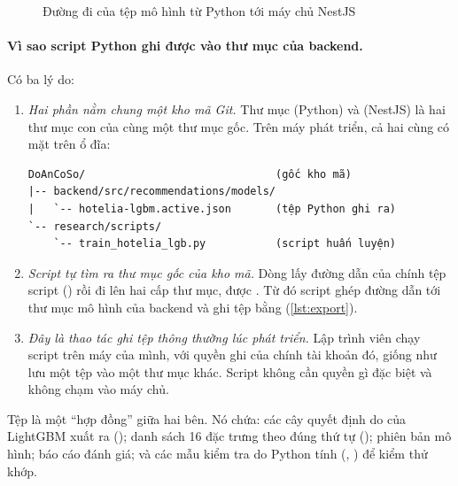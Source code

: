 \begin{figure}[H]
\centering
{}
\caption{Đường đi của tệp mô hình từ Python tới máy chủ NestJS}\label{fig:model-handoff}
\end{figure}

\paragraph{Vì sao script Python ghi được vào thư mục của backend.} Có ba lý do:

\begin{enumerate}
\item \emph{Hai phần nằm chung một kho mã Git.} Thư mục  (Python) và  (NestJS) là hai thư mục con của cùng một thư mục gốc. Trên máy phát triển, cả hai cùng có mặt trên ổ đĩa:
\begin{lstlisting}[numbers=none, language={}]
DoAnCoSo/                              (gốc kho mã)
|-- backend/src/recommendations/models/
|   `-- hotelia-lgbm.active.json       (tệp Python ghi ra)
`-- research/scripts/
    `-- train_hotelia_lgb.py           (script huấn luyện)
\end{lstlisting}
\item \emph{Script tự tìm ra thư mục gốc của kho mã.} Dòng  lấy đường dẫn của chính tệp script () rồi đi lên hai cấp thư mục, được . Từ đó script ghép đường dẫn tới thư mục mô hình của backend và ghi tệp bằng  (\cref{lst:export}).
\item \emph{Đây là thao tác ghi tệp thông thường lúc phát triển.} Lập trình viên chạy script trên máy của mình, với quyền ghi của chính tài khoản đó, giống như lưu một tệp vào một thư mục khác. Script không cần quyền gì đặc biệt và không chạm vào máy chủ.
\end{enumerate}



Tệp  là một ``hợp đồng'' giữa hai bên. Nó chứa: các cây quyết định do  của LightGBM xuất ra (); danh sách 16 đặc trưng theo đúng thứ tự (); phiên bản mô hình; báo cáo đánh giá; và các mẫu kiểm tra do Python tính (, ) để kiểm thử khớp.

